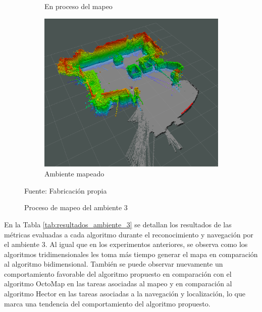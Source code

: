 \begin{figure}[H]
\begin{subfigure}[b]{0.30\textwidth}
    \caption{En proceso del mapeo}
    \label{fig:ambiente_3_2}
    \end{subfigure}
    \begin{subfigure}[b]{0.30\textwidth}
    \includegraphics[width=\textwidth, height=\textwidth]{figures/05experimentacion/ambiente_3/r02_03.png}
    \caption{Ambiente mapeado}
    \label{fig:ambiente_3_3}
    \end{subfigure}
    \caption{Proceso de mapeo del ambiente 3}
    Fuente: Fabricación propia
    \label{fig:ambiente_3}
\end{figure} 

En la Tabla \ref{tab:resultados_ambiente_3} se detallan los resultados de las métricas evaluadas a cada algoritmo durante el reconocimiento y navegación por el ambiente 3. Al igual que en los experimentos anteriores, se observa como los algoritmos tridimensionales les toma más tiempo generar el mapa en comparación al algoritmo bidimensional. También se puede observar nuevamente un comportamiento favorable del algoritmo propuesto en comparación con el algoritmo OctoMap en las tareas asociadas al mapeo y en comparación al algoritmo Hector en las tareas asociadas a la navegación y localización, lo que marca una tendencia del comportamiento del algoritmo propuesto.

